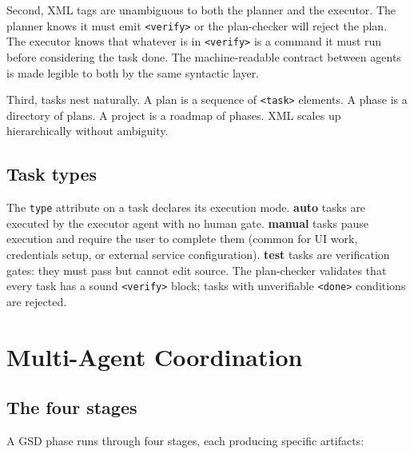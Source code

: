 \documentclass[11pt,letterpaper,openany]{book}
\begin{document}
Second, XML tags are unambiguous to both the planner and the executor. The planner knows it must emit \texttt{<verify>} or the plan-checker will reject the plan. The executor knows that whatever is in \texttt{<verify>} is a command it must run before considering the task done. The machine-readable contract between agents is made legible to both by the same syntactic layer.

Third, tasks nest naturally. A plan is a sequence of \texttt{<task>} elements. A phase is a directory of plans. A project is a roadmap of phases. XML scales up hierarchically without ambiguity.

\section{Task types}

The \texttt{type} attribute on a task declares its execution mode. \textbf{auto} tasks are executed by the executor agent with no human gate. \textbf{manual} tasks pause execution and require the user to complete them (common for UI work, credentials setup, or external service configuration). \textbf{test} tasks are verification gates: they must pass but cannot edit source. The plan-checker validates that every task has a sound \texttt{<verify>} block; tasks with unverifiable \texttt{<done>} conditions are rejected.

\chapter{Multi-Agent Coordination}

\section{The four stages}

A GSD phase runs through four stages, each producing specific artifacts:
\end{document}
